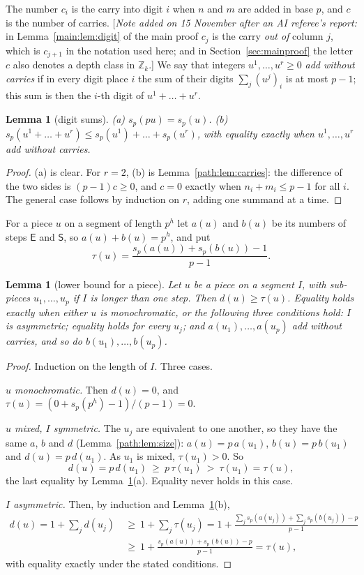 \documentclass[11pt]{article}
\newtheorem{lemma}[theorem]{Lemma}
\theoremstyle{definition}
\theoremstyle{remark}
\numberwithin{equation}{section}
\numberwithin{figure}{section}
\newcommand{\Z}{\mathbb Z}
\newcommand{\E}{\textsf{E}}
\newcommand{\Ss}{\textsf{S}}
\newcommand{\refnote}[1]{[\emph{Note added on 15 November after an AI referee's report:} #1]}
\begin{document}
The number $c_i$ is the carry into digit $i$ when $n$ and $m$ are added in base $p$, and $c$ is the number of
carries.
\refnote{in Lemma~\ref{main:lem:digit} of the main proof $c_j$ is the carry \emph{out of} column $j$, which is
$c_{j+1}$ in the notation used here; and in Section~\ref{sec:mainproof} the letter $c$ also denotes a depth
class in $\Z_k$.}
We say that integers $u^1,\dots,u^r\ge0$ \emph{add without carries} if in every digit place $i$ the sum of
their digits $\sum_j (u^j)_i$ is at most $p-1$; this sum is then the $i$-th digit of $u^1+\dots+u^r$.

\begin{lemma}[digit sums]\label{path:lem:digits}
\textup{(a)} $s_p(pu)=s_p(u)$. \textup{(b)} $s_p(u^1+\dots+u^r)\le s_p(u^1)+\dots+s_p(u^r)$, with equality
exactly when $u^1,\dots,u^r$ add without carries.
\end{lemma}
\begin{proof}
(a) is clear. For $r=2$, (b) is Lemma~\ref{path:lem:carries}: the difference of the two sides is $(p-1)c\ge0$, and $c=0$
exactly when $n_i+m_i\le p-1$ for all $i$. The general case follows by induction on $r$, adding one summand at a time.
\end{proof}

For a piece $u$ on a segment of length $p^h$ let $a(u)$ and $b(u)$ be its numbers of steps $\E$ and $\Ss$, so
$a(u)+b(u)=p^h$, and put
\[
\tau(u)=\frac{s_p(a(u))+s_p(b(u))-1}{p-1}.
\]

\begin{lemma}[lower bound for a piece]\label{path:lem:bound}
Let $u$ be a piece on a segment $I$, with sub-pieces $u_1,\dots,u_p$ if $I$ is longer than one step. Then
$d(u)\ge\tau(u)$. Equality holds exactly when either
$u$ is monochromatic, or the following three conditions hold: $I$ is asymmetric; equality holds for every
$u_j$; and $a(u_1),\dots,a(u_p)$ add without carries, and so do $b(u_1),\dots,b(u_p)$.
\end{lemma}
\begin{proof}
Induction on the length of $I$. Three cases.

\emph{$u$ monochromatic.} Then $d(u)=0$, and $\tau(u)=(0+s_p(p^h)-1)/(p-1)=0$.

\emph{$u$ mixed, $I$ symmetric.} The $u_j$ are equivalent to one another, so they have the same $a$, $b$ and $d$
(Lemma~\ref{path:lem:size}): $a(u)=p\,a(u_1)$, $b(u)=p\,b(u_1)$ and $d(u)=p\,d(u_1)$. As $u_1$ is mixed,
$\tau(u_1)>0$. So
\[
d(u)=p\,d(u_1)\ \ge\ p\,\tau(u_1)\ >\ \tau(u_1)=\tau(u),
\]
the last equality by Lemma~\ref{path:lem:digits}(a). Equality never holds in this case.

\emph{$I$ asymmetric.} Then, by induction and Lemma~\ref{path:lem:digits}(b),
\begin{align*}
d(u)=1+\sum_j d(u_j)\ &\ge\ 1+\sum_j\tau(u_j)
=1+\frac{\sum_j s_p(a(u_j))+\sum_j s_p(b(u_j))-p}{p-1}\\
&\ge\ 1+\frac{s_p(a(u))+s_p(b(u))-p}{p-1}=\tau(u),
\end{align*}
with equality exactly under the stated conditions.
\end{proof}
\end{document}
